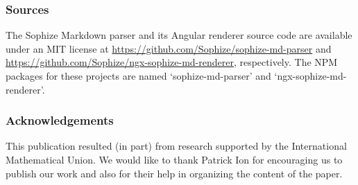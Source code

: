 \documentclass[a4paper]{article}
\begin{document}
\subsubsection*{Sources}
The Sophize Markdown parser and its Angular renderer source code are available under an MIT license at \url{https://github.com/Sophize/sophize-md-parser} and \url{https://github.com/Sophize/ngx-sophize-md-renderer}, respectively. The NPM packages for these projects are named `sophize-md-parser' and `ngx-sophize-md-renderer'.

\subsubsection*{Acknowledgements}
This publication resulted (in part) from research supported by the International Mathematical Union. We would like to thank Patrick Ion for encouraging us to publish our work and also for their help in organizing the content of the paper.

 


\end{document}
